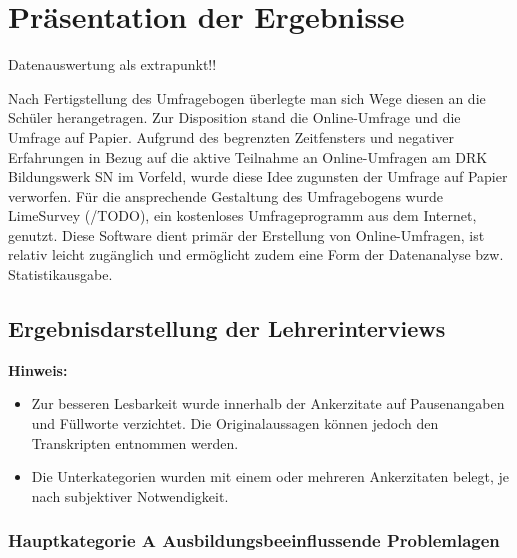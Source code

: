 \section{Präsentation der Ergebnisse}
\label{sec:PräsentationDerErgebnisse}

Datenauswertung als extrapunkt!!

Nach Fertigstellung des Umfragebogen überlegte man sich Wege diesen an die Schüler herangetragen. Zur Disposition stand die Online-Umfrage und die Umfrage auf Papier. Aufgrund des begrenzten Zeitfensters und negativer Erfahrungen in Bezug auf die aktive Teilnahme an Online-Umfragen am DRK Bildungswerk SN  im Vorfeld, wurde diese Idee zugunsten der Umfrage auf Papier verworfen. Für die ansprechende Gestaltung des Umfragebogens wurde LimeSurvey (/TODO), ein kostenloses Umfrageprogramm aus dem Internet, genutzt. Diese Software dient primär der Erstellung von Online-Umfragen, ist relativ leicht zugänglich und ermöglicht zudem eine Form der Datenanalyse bzw. Statistikausgabe.


\subsection{Ergebnisdarstellung der Lehrerinterviews}
\label{sec:ErgebnisdarstellungDerLehrerinterviews}

\textbf{Hinweis:} 
\begin{itemize}
	\item Zur besseren Lesbarkeit wurde innerhalb der Ankerzitate auf Pausenangaben und Füllworte verzichtet. Die Originalaussagen können jedoch den Transkripten entnommen werden.
	\item Die Unterkategorien wurden mit einem oder mehreren Ankerzitaten belegt, je nach subjektiver Notwendigkeit.
\end{itemize}


\subsubsection{Hauptkategorie A Ausbildungsbeeinflussende Problemlagen}
\label{sec:HauptkategorieAAusbildungsbeeinflussendeProblemlagen}

